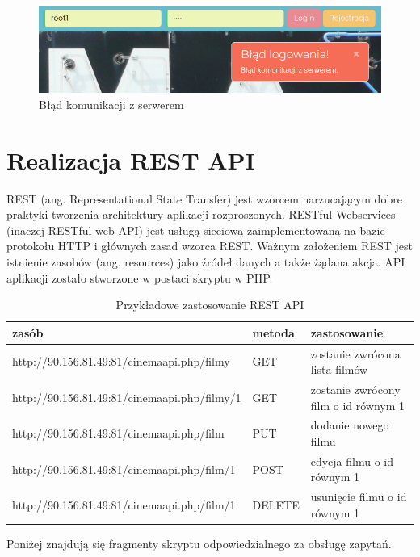 \begin{figure} [H]
	\centering
	\includegraphics[width=1\linewidth]{rozdzial05/interfejs/alert2.png}
	\caption{Błąd komunikacji z serwerem}
	\label{fig:alert2}
\end{figure}

\section{Realizacja REST API}

REST (ang. Representational State Transfer) jest wzorcem narzucającym dobre praktyki tworzenia architektury aplikacji rozproszonych. RESTful Webservices (inaczej RESTful web API) jest usługą sieciową zaimplementowaną na bazie protokołu HTTP i głównych zasad wzorca REST. Ważnym założeniem REST jest istnienie zasobów (ang. resources) jako źródeł danych a także żądana akcja. API aplikacji zostało stworzone w postaci skryptu w PHP.

\begin{table}[H]
\centering

\label{restApi}
\begin{tabular}{|l|l|l|}
\hline
\textbf{zasób}                               & \textbf{metoda} & \textbf{zastosowanie}                \\ \hline
http://90.156.81.49:81/cinemaapi.php/filmy   & GET             & zostanie zwrócona lista filmów       \\ \hline
http://90.156.81.49:81/cinemaapi.php/filmy/1 & GET             & zostanie zwrócony film o id równym 1 \\ \hline
http://90.156.81.49:81/cinemaapi.php/film    & PUT             & dodanie nowego filmu                 \\ \hline
http://90.156.81.49:81/cinemaapi.php/film/1  & POST            & edycja filmu o id równym 1           \\ \hline
http://90.156.81.49:81/cinemaapi.php/film/1  & DELETE          & usunięcie filmu o id równym 1        \\ \hline
\end{tabular}
\caption{Przykładowe zastosowanie REST API}
\end{table}

Poniżej znajdują się fragmenty skryptu odpowiedzialnego za obsługę zapytań.



